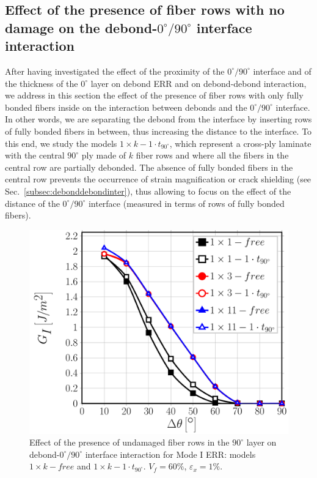 \documentclass[review]{elsarticle}
\begin{document}
\subsection{Effect of the presence of fiber rows with no damage on the debond-$0^{\circ}/90^{\circ}$ interface interaction}

After having investigated the effect of the proximity of the $0^{\circ}/90^{\circ}$ interface and of the thickness of the $0^{\circ}$ layer on debond ERR and on debond-debond interaction, we address in this section the effect of the presence of fiber rows with only fully bonded fibers inside on the interaction between debonds and the $0^{\circ}/90^{\circ}$ interface. In other words, we are separating the debond from the interface by inserting rows of fully bonded fibers in between, thus increasing the distance to the interface. To this end, we study the models $1\times k-1\cdot t_{90^{\circ}}$, which represent a cross-ply laminate with the central $90^{\circ}$ ply made of $k$ fiber rows and where all the fibers in the central row are partially debonded. The absence of fully bonded fibers in the central row prevents the occurrence of strain magnification or crack shielding (see Sec.~\ref{subsec:debonddebondinter}), thus allowing to focus on the effect of the distance of the $0^{\circ}/90^{\circ}$ interface (measured in terms of rows of fully bonded fibers).

\begin{figure}[!h]
\centering
\includegraphics[width=\textwidth]{1xk-1-vf60-GI.pdf}
\caption{Effect of the presence of undamaged fiber rows in the $90^{\circ}$ layer on debond-$0^{\circ}/90^{\circ}$ interface interaction for Mode I ERR: models $1\times k-free$ and $1\times k-1\cdot t_{90^{\circ}}$. $V_{f}=60\%$, $\varepsilon_{x}=1\%$.}\label{fig:1kGI}
\end{figure}
\end{document}
